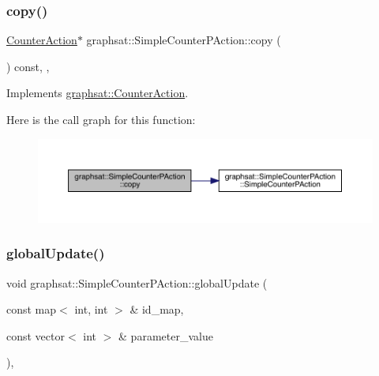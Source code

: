 \subsubsection{\texorpdfstring{copy()}{copy()}}
{\footnotesize\ttfamily \mbox{\hyperlink{classgraphsat_1_1_counter_action}{Counter\+Action}}$\ast$ graphsat\+::\+Simple\+Counter\+P\+Action\+::copy (\begin{DoxyParamCaption}{ }\end{DoxyParamCaption}) const\hspace{0.3cm}{\ttfamily [inline]}, {\ttfamily [private]}, {\ttfamily [virtual]}}



Implements \mbox{\hyperlink{classgraphsat_1_1_counter_action_aa6ab6ebd8e13b466dba062efea962691}{graphsat\+::\+Counter\+Action}}.

Here is the call graph for this function\+:
\nopagebreak
\begin{figure}[H]
\begin{center}
\leavevmode
\includegraphics[width=350pt]{classgraphsat_1_1_simple_counter_p_action_ad7a689c0bc048013e29ea4a9c77e7779_cgraph}
\end{center}
\end{figure}
\mbox{\label{classgraphsat_1_1_simple_counter_p_action_ae4d8689afbfd0d5f8a351bf19dbb8132}} 
\subsubsection{\texorpdfstring{globalUpdate()}{globalUpdate()}}
{\footnotesize\ttfamily void graphsat\+::\+Simple\+Counter\+P\+Action\+::global\+Update (\begin{DoxyParamCaption}\item[{const map$<$ int, int $>$ \&}]{id\+\_\+map,  }\item[{const vector$<$ int $>$ \&}]{parameter\+\_\+value }\end{DoxyParamCaption})\hspace{0.3cm}{\ttfamily [inline]}, {\ttfamily [virtual]}}

